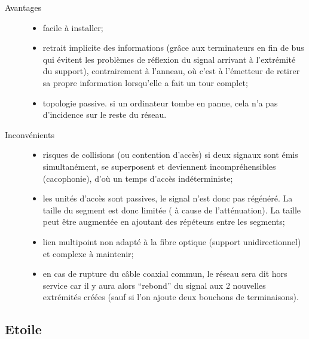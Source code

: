 \documentclass[11pt,english,french]{scrreprt}
\theoremstyle{remark}
\theoremstyle{definition}
\begin{document}
\begin{description}
	\item [Avantages]
	\begin{itemize}
		\item facile à installer;
		\item retrait implicite des informations (grâce aux terminateurs en fin de bus qui évitent les problèmes de réflexion du signal arrivant à l'extrémité du support), contrairement à l'anneau, où c'est à l'émetteur de retirer sa propre information lorsqu'elle a fait un tour complet;
		\item topologie passive. si un ordinateur tombe en panne, cela n'a pas d'incidence sur le reste du réseau.
	\end{itemize}
	\item [Inconvénients]
	\begin{itemize}
		\item risques de collisions (ou contention d'accès) si deux signaux sont émis simultanément, se superposent et deviennent incompréhensibles (cacophonie), d'où un temps d'accès indéterministe;
		\item les unités d'accès sont passives, le signal n'est donc pas régénéré. La taille du segment est donc limitée ( à cause de l'atténuation). La taille peut  être augmentée en ajoutant des répéteurs entre les segments;
		\item lien multipoint non adapté à la fibre optique (support unidirectionnel) et complexe à maintenir;
		\item en cas de rupture du câble coaxial commun, le réseau sera dit hors service car il y aura alors “rebond” du signal aux 2 nouvelles extrémités créées (sauf si l'on ajoute deux bouchons de terminaisons).
	\end{itemize}
\end{description}

\subsection{Etoile} %
\end{document}
